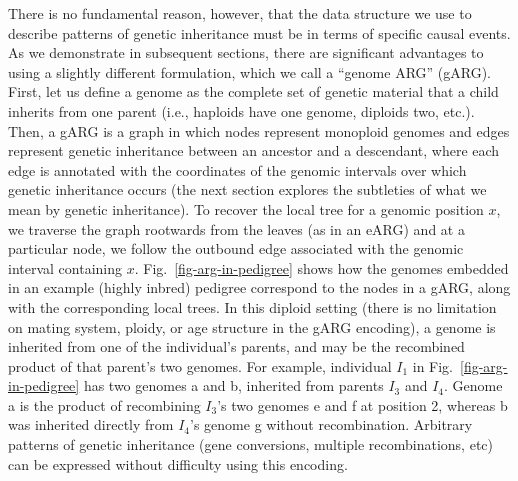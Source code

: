 \documentclass{article}
\begin{document}
There is no fundamental reason, however, that the data structure we use
to describe patterns of genetic inheritance must be in terms
of specific causal events. As we demonstrate in subsequent sections,
there are significant advantages to using
a slightly different formulation, which
we call a ``genome ARG'' (gARG).
First, let us define a genome as the complete set of genetic material that a child
inherits from one parent (i.e., haploids have one genome, diploids two, etc.).
Then, a gARG is a graph in which nodes represent
monoploid genomes  and edges represent
genetic inheritance between an ancestor and a descendant,
where each edge is annotated with the coordinates
of the genomic intervals over which genetic inheritance occurs
(the next section explores the subtleties of what we mean by
genetic inheritance). To recover the local tree for a genomic
position $x$, we traverse the graph rootwards from the leaves
(as in an eARG) and at a particular node, we follow the outbound
edge associated with the genomic interval containing $x$.
Fig.~\ref{fig-arg-in-pedigree}
shows how the genomes embedded in an example (highly inbred)
pedigree correspond to the nodes in a gARG, along with the corresponding
local trees.
In this diploid setting
(there is no limitation on mating system, ploidy, or age structure
in the gARG encoding),
a genome is inherited from one
of the individual's parents,
and may be the recombined product of that parent's two genomes.
For example, individual $I_1$ in Fig.~\ref{fig-arg-in-pedigree}
has two genomes \textsf{a} and \textsf{b},
inherited from parents $I_3$ and $I_4$. Genome \textsf{a} is the product of
recombining $I_3$'s two genomes \textsf{e} and \textsf{f} at position 2,
whereas \textsf{b} was inherited directly from $I_4$'s genome \textsf{g} without
recombination.
Arbitrary patterns of genetic inheritance (gene conversions, multiple recombinations,
etc) can be expressed without difficulty using this encoding.
\end{document}
